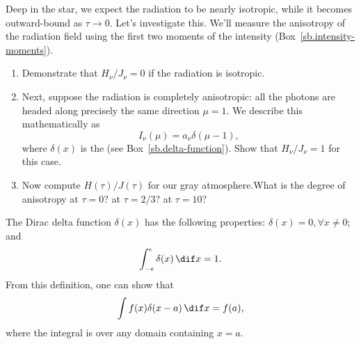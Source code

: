 \begin{exercisebox}
Deep in the star, we expect the radiation to be nearly isotropic, while it becomes outward-bound as $\tau\to 0$. Let's investigate this. We'll measure the anisotropy of the radiation field using the first two moments of the intensity (Box~\ref{sb.intensity-moments}).
\begin{enumerate}
\item
Demonstrate that $H_{\nu}/J_{\nu} = 0$ if the radiation is isotropic.

\item
Next, suppose the radiation is completely anisotropic: all the photons are headed along precisely the same direction $\mu = 1$. We describe this mathematically as
\begin{equation}
I_{\nu}(\mu) = a_{\nu} \delta(\mu - 1),
\end{equation}
where $\delta(x)$ is the  (see Box~\ref{sb.delta-function}).
Show that $H_{\nu}/J_{\nu} = 1$ for this case.

\item
Now compute $H(\tau)/J(\tau)$ for our gray atmosphere.What is the degree of anisotropy at $\tau = 0$? at $\tau=2/3$? at $\tau = 10$?
\end{enumerate}
\end{exercisebox}

\begin{sidebar}
\label{sb.delta-function}
The Dirac delta function $\delta(x)$ has the following properties: $\delta(x) = 0, \forall x \neq 0$; and
\[
\int_{-\epsilon}^{\epsilon} \delta(x)\,\dif x = 1.
\]
From this definition, one can show that
\[
	\int f(x) \delta(x-a)\,\dif x = f(a),
\]
where the integral is over any domain containing $x = a$.
\end{sidebar}

